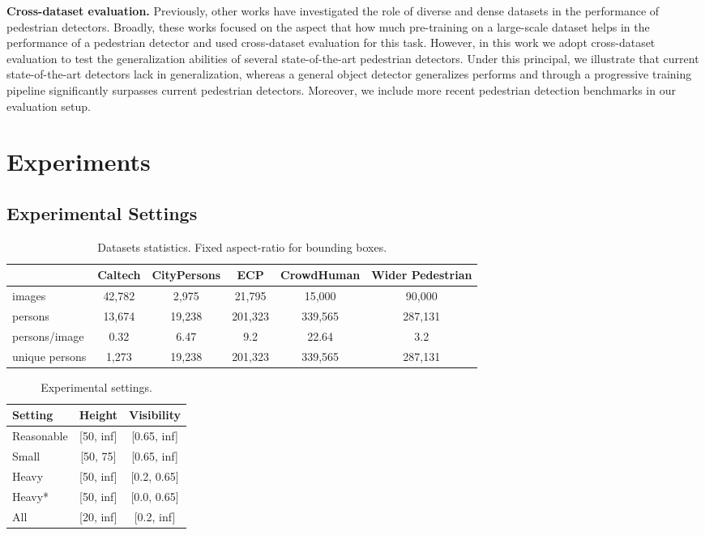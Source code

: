 \documentclass[final]{cvpr}
\begin{document}
\noindent\textbf{Cross-dataset evaluation.}
Previously, other works \cite{braun2018eurocity,shao2018crowdhuman,zhang2017citypersons} have investigated the role of diverse and dense datasets in the performance of pedestrian detectors. 
Broadly, these works focused on the aspect that how much pre-training on a large-scale dataset helps in the performance of a pedestrian detector and used cross-dataset evaluation for this task. However, in this work we adopt cross-dataset evaluation to test the generalization abilities of several state-of-the-art pedestrian detectors.
Under this principal, we illustrate that current state-of-the-art detectors lack in generalization, whereas a general object detector generalizes performs and through a progressive training pipeline significantly surpasses current pedestrian detectors. 
Moreover, we include more recent pedestrian detection benchmarks in our evaluation setup. 

 





 \section{Experiments} \label{sec:experi}
\subsection{Experimental Settings}

\begin{table*}[tb]
\centering
\caption{Datasets statistics.  Fixed aspect-ratio for bounding boxes.}
\label{tab:data-stat}
\begin{tabular}{l|c| c| c| c| c}
\hline
 & Caltech  & CityPersons  & ECP & CrowdHuman& Wider Pedestrian\\ \hline
images &42,782  & 2,975  & 21,795 & 15,000 &90,000  \\ \hline
persons &13,674  &19,238  & 201,323 &339,565  &287,131  \\ \hline
persons/image &0.32  &6.47  & 9.2 &22.64  &3.2  \\ \hline
unique persons &1,273  &19,238  & 201,323 &339,565  & 287,131  \\ \hline
\end{tabular}
\end{table*}

\begin{table}[tb]
\centering
\caption{Experimental settings.}
\label{tab:exp-setting}
\begin{tabular}{l|c|c}
\hline
Setting             & Height & Visibility \\ \hline
Reasonable    & [50, inf]  &    [0.65, inf] \\ \hline
Small    & [50, 75] & [0.65, inf]    \\ \hline
Heavy &  [50, inf] &    [0.2, 0.65]\\ \hline
Heavy* &  [50, inf] &    [0.0, 0.65]\\ \hline
All &   [20, inf]  & [0.2, inf]  \\ \hline
\end{tabular}
\end{table}
\end{document}
